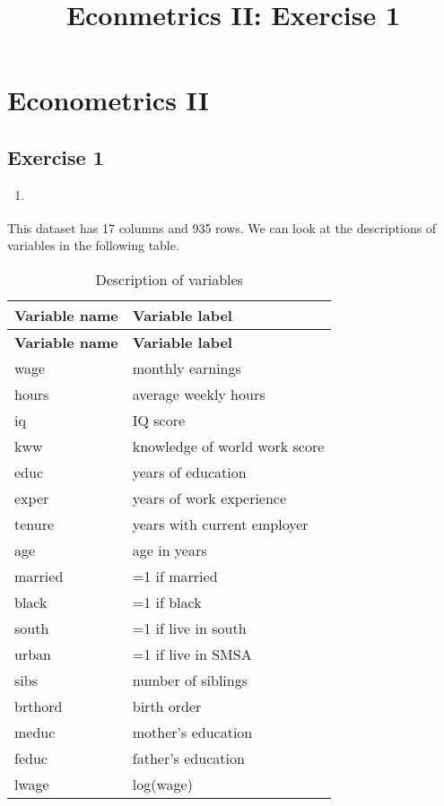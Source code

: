 \documentclass[
  12pt,
]{article}
\title{Econmetrics II: Exercise 1}
\author{}
\date{\vspace{-2.5em}}
\providecommand{\tightlist}{%
  \setlength{\itemsep}{0pt}\setlength{\parskip}{0pt}}
\begin{document}
\maketitle

\hypertarget{econometrics-ii}{%
\section{Econometrics II}\label{econometrics-ii}}

\hypertarget{exercise-1}{%
\subsection{Exercise 1}\label{exercise-1}}

\begin{enumerate}
\def\labelenumi{(\alph{enumi})}
\tightlist
\item
  \textbf{\color{red}{Load the data into Stata and familiarize yourself with the structure and the variables using different descriptive statistics.}}
\end{enumerate}

This dataset has 17 columns and 935 rows. We can look at the
descriptions of variables in the following table.

\begin{longtable}[]{@{}ll@{}}
\caption{Description of variables}\tabularnewline
\toprule
\textbf{Variable name} & \textbf{Variable label}\tabularnewline
\midrule
\endfirsthead
\toprule
\textbf{Variable name} & \textbf{Variable label}\tabularnewline
\midrule
\endhead
wage & monthly earnings\tabularnewline
hours & average weekly hours\tabularnewline
iq & IQ score\tabularnewline
kww & knowledge of world work score\tabularnewline
educ & years of education\tabularnewline
exper & years of work experience\tabularnewline
tenure & years with current employer\tabularnewline
age & age in years\tabularnewline
married & =1 if married\tabularnewline
black & =1 if black\tabularnewline
south & =1 if live in south\tabularnewline
urban & =1 if live in SMSA\tabularnewline
sibs & number of siblings\tabularnewline
brthord & birth order\tabularnewline
meduc & mother's education\tabularnewline
feduc & father's education\tabularnewline
lwage & log(wage)\tabularnewline
\bottomrule
\end{longtable}
\end{document}

